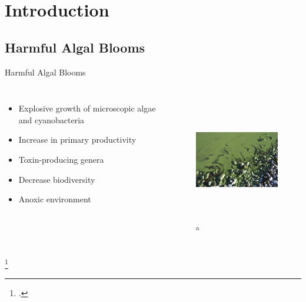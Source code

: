\section{Introduction}

\subsection{Harmful Algal Blooms}
\begin{frame}{Harmful Algal Blooms}

\begin{columns}

	\begin{itemize}
		\item Explosive growth of microscopic algae and cyanobacteria
		\item Increase in primary productivity
		\item Toxin-producing genera
		\item Decrease biodiversity
		\item Anoxic environment
	\end{itemize}

	\begin{figure}
		\hspace*{-1cm}
		\includegraphics[width=2in,height=2in]{algal.jpg} \textsubscript{a}
		
	\end{figure}
\end{columns}
\footcitetext{[a]http://www.pme.com/wp-content/uploads/algal.jpg}
\end{frame}

